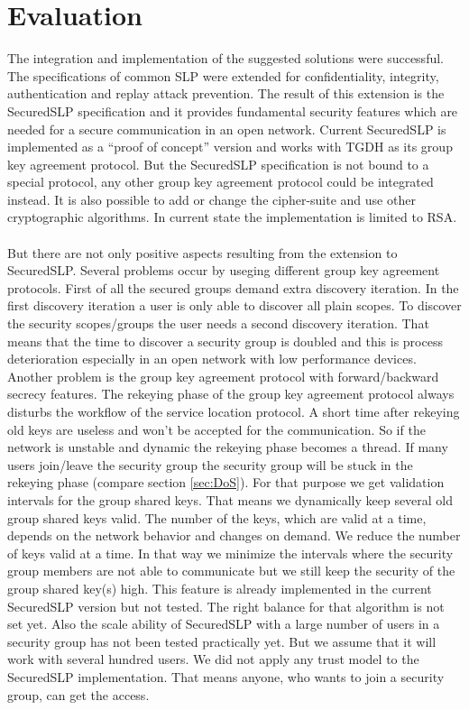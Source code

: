 \section{Evaluation}\label{sec:evaluation}
The integration and implementation of the suggested solutions were successful. The specifications of common SLP were extended for confidentiality, integrity, authentication and replay attack prevention. The result of this extension is the SecuredSLP specification and it provides fundamental security features which are needed for a secure communication in an open network. Current SecuredSLP is implemented as a ``proof of concept'' version and works with TGDH as its group key agreement protocol. But the SecuredSLP specification is not bound to a special protocol, any other group key agreement protocol could be integrated instead. It is also possible to add or change the cipher-suite and use other cryptographic algorithms. In current state the implementation is limited to RSA.\\\\
But there are not only positive aspects resulting from the extension to SecuredSLP. Several problems occur by useging different group key agreement protocols. First of all the secured groups demand extra discovery iteration. In the first discovery iteration a user is only able to discover all plain scopes. To discover the security scopes/groups the user needs a second discovery iteration. That means that the time to discover a security group is doubled and this is process deterioration especially in an open network with low performance devices. Another problem is the group key agreement protocol with forward/backward secrecy features. The rekeying phase of the group key agreement protocol always disturbs the workflow of the service location protocol. A short time after rekeying old keys are useless and won't be accepted for the communication. So if the network is unstable and dynamic the rekeying phase becomes a thread. If many users join/leave the security group the security group will be stuck in the rekeying phase (compare section \ref{sec:DoS}). For that purpose we get validation intervals for the group shared keys. That means we dynamically keep several old group shared keys valid. The number of the keys, which are valid at a time, depends on the network behavior and changes on demand. We reduce the number of keys valid at a time. In that way we minimize the intervals where the security group members are not able to communicate but we still keep the security of the group shared key(s) high. This feature is already implemented in the current SecuredSLP version but not tested. The right balance for that algorithm is not set yet. Also the scale ability of SecuredSLP with a large number of users in a security group has not been tested practically yet. But we assume that it will work with several hundred users. We did not apply any trust model to the SecuredSLP implementation. That means anyone, who wants to join a security group, can get the access.\\
